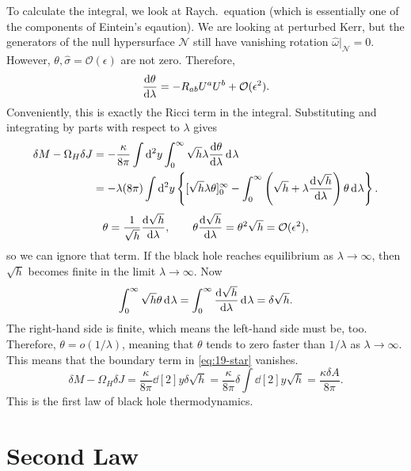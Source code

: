 
To calculate the integral, we look at Raych.~equation (which is essentially one of the components of Eintein's eqaution).
We are looking at perturbed Kerr, but the generators of the null hypersurface $\mathcal{N}$ still have vanishing rotation $\hat{\omega}\rvert_\mathcal{N} = 0$. However, $\theta, \hat{\sigma} = \mathcal{O}(\epsilon)$ are not zero.
Therefore,
\begin{equation}
  \dv{\theta}{\lambda} = - R_{ab} U^{a} U^{b} + \mathcal{O}(\epsilon^2).
\end{equation}
Conveniently, this is exactly the Ricci term in the integral.
Substituting and integrating by parts with respect to $\lambda$ gives
\begin{align}
  \delta M - \Omega_H \delta J &= -\frac{\kappa}{8 \pi} \int \dd[2]{y} \int_{0}^{\infty} \sqrt{h} \lambda \dv{\theta}{\lambda} \dd[]{\lambda}  \\
			       &= -\lambda(8\pi) \int \dd[2]{y} \left\{ [\sqrt{h} \lambda \theta]_0^\infty - \int_0^\infty \left( \sqrt{h} + \lambda \dv{\sqrt{h}}{\lambda} \right) \theta \dd[]{\lambda} \right\} \label{eq:19-star}.
\end{align}
\begin{equation}
  \theta = \frac{1}{\sqrt{h}} \dv{\sqrt{h}}{\lambda}, \qquad \theta \dv{\sqrt{h}}{\lambda} = \theta^2 \sqrt{h} = \mathcal{O}(\epsilon^2),
\end{equation}
so we can ignore that term.
If the black hole reaches equilibrium as $\lambda \to \infty$, then $\sqrt{h}$ becomes finite in the limit $\lambda \to \infty$.
Now
\begin{equation}
  \int_0^\infty \sqrt{h} \theta \dd[]{\lambda} = \int_0^\infty \dv{\sqrt{h}}{\lambda} \dd[]{\lambda} = \delta \sqrt{h}.
\end{equation}
The right-hand side is finite, which means the left-hand side must be, too.
Therefore, $\theta = o \left( 1 / \lambda \right)$, meaning that $\theta$ tends to zero faster than $1 / \lambda$ as $\lambda \to \infty$.
This means that the boundary term in \eqref{eq:19-star} vanishes.
\begin{equation}
  \delta M - \Omega_H \delta J = \frac{\kappa}{8 \pi} \dd[2]{y} \delta \sqrt{h} = \frac{\kappa}{8 \pi} \delta \int \dd[2]{y} \sqrt{h} = \frac{\kappa \delta A}{8 \pi}.
\end{equation}
This is the first law of black hole thermodynamics.

\section{Second Law}%
\label{sec:second_law}

